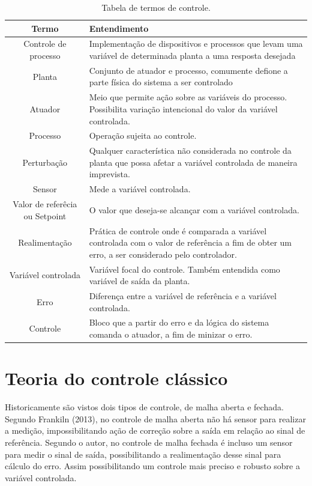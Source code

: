 \newpage
\begin{table}[]
    \centering
    \begin{tabular}{|c|m{9cm}|}
        \hline
        Termo & Entendimento \\
        \hline
        Controle de processo & Implementação de dispositivos e processos que levam uma variável de determinada planta a uma resposta desejada \\
        \hline
        Planta & Conjunto de atuador e processo, comumente defione a parte física do sistema a ser controlado\\
        \hline
        Atuador & Meio que permite ação sobre as variáveis do processo. Possibilita variação intencional do valor da variável controlada.\\
        \hline
        Processo & Operação sujeita ao controle.\\
        \hline
        Perturbação & Qualquer característica não considerada no controle da planta que possa afetar a variável controlada de maneira imprevista.\\
        \hline
        Sensor & Mede a variável controlada.\\
        \hline
        Valor de referêcia ou Setpoint & O valor que deseja-se alcançar com a variável controlada.\\
        \hline
        Realimentação & Prática de controle onde é comparada a variável controlada com o valor de referência a fim de obter um erro, a ser considerado pelo controlador.\\
        \hline
        Variável controlada & Variável focal do controle. Também entendida como variável de saída da planta.\\
        \hline
        Erro & Diferença entre a variável de referência e a variável controlada.\\
        \hline
        Controle & Bloco que a partir do erro e da lógica do sistema comanda o atuador, a fim de minizar o erro.\\
        \hline
    \end{tabular}
    \caption{Tabela de termos de controle.}
    \label{tab:my_label}
\end{table}

\section{Teoria do controle clássico}

\hspace{11mm} Historicamente são vistos dois tipos de controle, de malha aberta e fechada. Segundo Frankiln (2013), no controle de malha aberta não há sensor para realizar a medição, impossibilitando ação de correção sobre a saída em relação ao sinal de referência. Segundo o autor, no controle de malha fechada é incluso um sensor para medir o sinal de saída, possibilitando a realimentação desse sinal para cálculo do erro. Assim possibilitando um controle mais preciso e robusto sobre a variável controlada.

